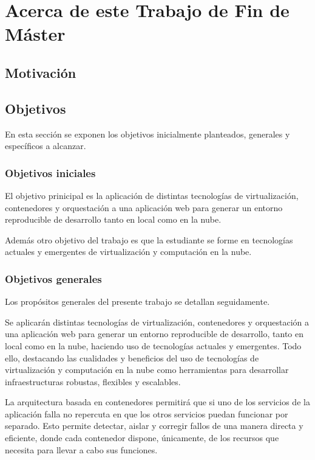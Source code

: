 \chapter{Acerca de este Trabajo de Fin de Máster}
\label{cha:introduction}

\section{Motivación}

\section{Objetivos}

En esta sección se exponen los objetivos inicialmente planteados, generales y específicos a alcanzar.

\subsection{Objetivos iniciales}

El objetivo prinicipal es la aplicación de distintas tecnologías de virtualización, contenedores y orquestación a una aplicación web para generar un entorno reproducible de desarrollo tanto en local como en la nube.

Además otro objetivo del trabajo es que la estudiante se forme en tecnologías actuales y emergentes de virtualización y computación en la nube.

\subsection{Objetivos generales}

Los propósitos generales del presente trabajo se detallan seguidamente.

Se aplicarán distintas tecnologías de virtualización, contenedores y orquestación a una aplicación web para generar un entorno reproducible de desarrollo, tanto en local como en la nube, haciendo uso de tecnologías actuales y emergentes. Todo ello, destacando las cualidades y beneficios del uso de tecnologías de virtualización y computación en la nube como herramientas para desarrollar infraestructuras robustas, flexibles y escalables.

La arquitectura basada en contenedores permitirá que si uno de los servicios de la aplicación falla no repercuta en que los otros servicios puedan funcionar por separado. Esto permite detectar, aislar y corregir fallos de una manera directa y eficiente, donde cada contenedor dispone, únicamente, de los recursos que necesita para llevar a cabo sus funciones.

